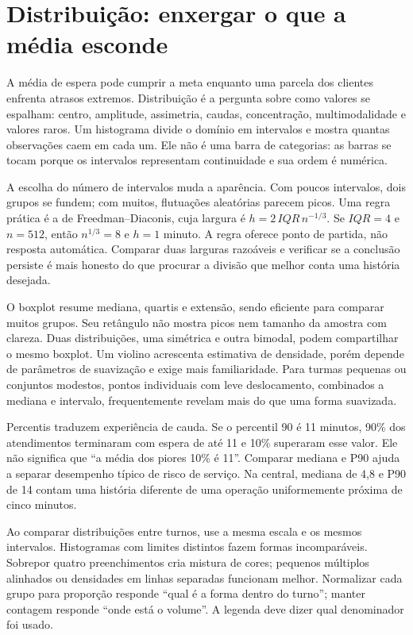 \section{Distribuição: enxergar o que a média esconde}

A média de espera pode cumprir a meta enquanto uma parcela dos clientes enfrenta atrasos extremos. Distribuição é a pergunta sobre como valores se espalham: centro, amplitude, assimetria, caudas, concentração, multimodalidade e valores raros. Um histograma divide o domínio em intervalos e mostra quantas observações caem em cada um. Ele não é uma barra de categorias: as barras se tocam porque os intervalos representam continuidade e sua ordem é numérica.

A escolha do número de intervalos muda a aparência. Com poucos intervalos, dois grupos se fundem; com muitos, flutuações aleatórias parecem picos. Uma regra prática é a de Freedman--Diaconis, cuja largura é $h=2\,IQR\,n^{-1/3}$. Se $IQR=4$ e $n=512$, então $n^{1/3}=8$ e $h=1$ minuto. A regra oferece ponto de partida, não resposta automática. Comparar duas larguras razoáveis e verificar se a conclusão persiste é mais honesto do que procurar a divisão que melhor conta uma história desejada.

O boxplot resume mediana, quartis e extensão, sendo eficiente para comparar muitos grupos. Seu retângulo não mostra picos nem tamanho da amostra com clareza. Duas distribuições, uma simétrica e outra bimodal, podem compartilhar o mesmo boxplot. Um violino acrescenta estimativa de densidade, porém depende de parâmetros de suavização e exige mais familiaridade. Para turmas pequenas ou conjuntos modestos, pontos individuais com leve deslocamento, combinados a mediana e intervalo, frequentemente revelam mais do que uma forma suavizada.

Percentis traduzem experiência de cauda. Se o percentil 90 é 11 minutos, 90\% dos atendimentos terminaram com espera de até 11 e 10\% superaram esse valor. Ele não significa que ``a média dos piores 10\% é 11''. Comparar mediana e P90 ajuda a separar desempenho típico de risco de serviço. Na central, mediana de 4,8 e P90 de 14 contam uma história diferente de uma operação uniformemente próxima de cinco minutos.

Ao comparar distribuições entre turnos, use a mesma escala e os mesmos intervalos. Histogramas com limites distintos fazem formas incomparáveis. Sobrepor quatro preenchimentos cria mistura de cores; pequenos múltiplos alinhados ou densidades em linhas separadas funcionam melhor. Normalizar cada grupo para proporção responde ``qual é a forma dentro do turno''; manter contagem responde ``onde está o volume''. A legenda deve dizer qual denominador foi usado.


